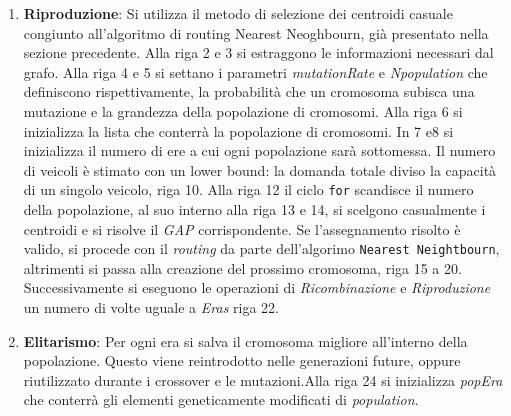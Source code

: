 \documentclass[]{article}
\begin{document}
\begin{enumerate}
\item \textbf{Riproduzione}: Si utilizza il metodo di selezione dei centroidi casuale congiunto all'algoritmo di routing Nearest Neoghbourn, già presentato nella sezione precedente.
Alla riga 2 e 3 si estraggono le informazioni necessari dal grafo. Alla riga 4 e 5 si settano i parametri \textit{mutationRate} e \textit{Npopulation} che definiscono rispettivamente, la probabilità che un cromosoma subisca una mutazione e la grandezza della popolazione di cromosomi. Alla riga 6 si inizializza la lista che conterrà la popolazione di cromosomi. In 7 e8 si inizializza il numero di ere a cui ogni popolazione sarà sottomessa. Il numero di veicoli è stimato con un lower bound: la domanda totale diviso la capacità di un singolo veicolo, riga 10. Alla riga 12 il ciclo \texttt{for} scandisce il numero della popolazione, al suo interno alla riga 13 e 14, si scelgono casualmente i centroidi e si risolve il \textit{GAP} corrispondente. Se l'assegnamento risolto è valido, si procede con il \emph{routing} da parte dell'algorimo \texttt{Nearest Neightbourn}, altrimenti si passa alla creazione del prossimo cromosoma, riga 15 a 20.
Successivamente si eseguono le operazioni di \textit{Ricombinazione} e \textit{Riproduzione} un numero di volte uguale a \textit{Eras} riga 22.

\item  \textbf{Elitarismo}:
Per ogni era si salva il cromosoma migliore all'interno della popolazione. Questo viene reintrodotto nelle generazioni future, oppure riutilizzato durante i crossover e le mutazioni.Alla riga 24 si inizializza \textit{popEra} che conterrà gli elementi geneticamente modificati di  \textit{population}.


\end{enumerate}
\end{document}
